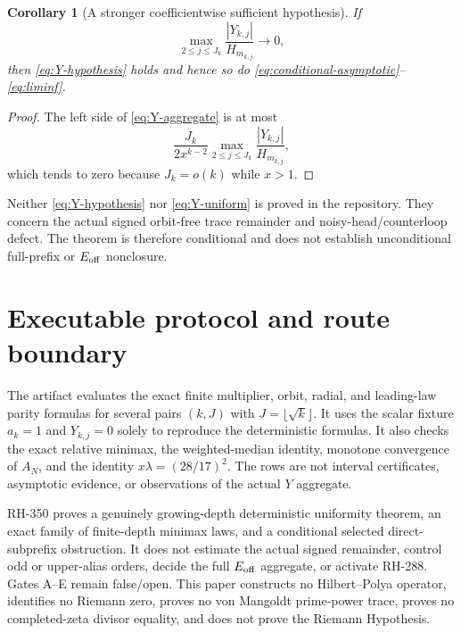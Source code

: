 \documentclass[11pt]{article}
\newtheorem{corollary}[theorem]{Corollary}
\theoremstyle{remark}
\begin{document}
\begin{corollary}[A stronger coefficientwise sufficient hypothesis]
If
\begin{equation}\label{eq:Y-uniform}
 \max_{2\le j\le J_k}
 \frac{|Y_{k,j}|}{H_{m_{k,j}}}\longrightarrow0,
\end{equation}
then \eqref{eq:Y-hypothesis} holds and hence so do
\eqref{eq:conditional-asymptotic}--\eqref{eq:liminf}.
\end{corollary}

\begin{proof}
The left side of \eqref{eq:Y-aggregate} is at most
\[
 \frac{J_k}{2x^{k-2}}
 \max_{2\le j\le J_k}\frac{|Y_{k,j}|}{H_{m_{k,j}}},
\]
which tends to zero because $J_k=o(k)$ while $x>1$.
\end{proof}

Neither \eqref{eq:Y-hypothesis} nor \eqref{eq:Y-uniform} is proved in the
repository.  They concern the actual signed orbit-free trace remainder and
noisy-head/counterloop defect.  The theorem is therefore conditional and
does not establish unconditional full-prefix or $E_{\rm off}$ nonclosure.

\section{Executable protocol and route boundary}

The artifact evaluates the exact finite multiplier, orbit, radial, and
leading-law parity formulas for several pairs $(k,J)$ with
$J=\lfloor\sqrt{k}\rfloor$.  It uses the scalar fixture $a_k=1$ and
$Y_{k,j}=0$ solely to reproduce the deterministic formulas.  It also checks
the exact relative minimax, the weighted-median identity, monotone
convergence of $A_N$, and the identity $x\lambda=(28/17)^2$.  The rows are
not interval certificates, asymptotic evidence, or observations of the
actual $Y$ aggregate.

RH-350 proves a genuinely growing-depth deterministic uniformity theorem,
an exact family of finite-depth minimax laws, and a conditional selected
direct-subprefix obstruction.  It does not estimate the actual signed
remainder, control odd or upper-alias orders, decide the full
$E_{\rm off}$ aggregate, or activate RH-288.  Gates A--E remain false/open.
This paper constructs no Hilbert--Polya operator, identifies no Riemann
zero, proves no von Mangoldt prime-power trace, proves no completed-zeta
divisor equality, and does not prove the Riemann Hypothesis.



\end{document}
